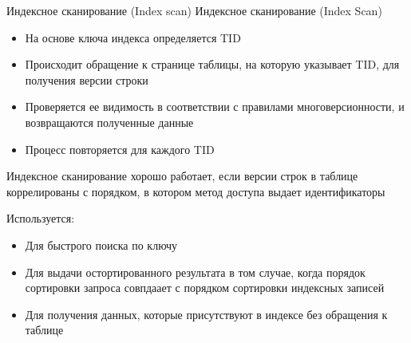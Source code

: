\documentclass[12pt]{article}
\begin{document}
\begin{defin}{Индексное сканирование (Index scan)}
    Индексное сканирование (Index Scan) 

    \begin{itemize}
        \item На основе ключа индекса определяется TID 
        \item Происходит обращение к странице таблицы, на которую указывает TID, для получения версии строки 
        \item Проверяется ее видимость в соответствии с правилами многоверсионности, и возвращаются полученные данные 
        \item Процесс повторяется для каждого TID 
    \end{itemize}

    Индексное сканирование хорошо работает, если версии строк в таблице коррелированы с порядком, в котором метод доступа выдает идентификаторы 

    Используется:

    \begin{itemize}
        \item Для быстрого поиска по ключу 
        \item Для выдачи остортированного результата в том случае, когда порядок сортировки запроса совпдаает с порядком сортировки индексных записей 
        \item Для получения данных, которые присутствуют в индексе без обращения к таблице 
    \end{itemize}
\end{defin}
\end{document}
